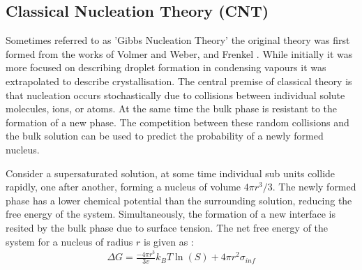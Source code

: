 \subsection{Classical Nucleation Theory (CNT)}
Sometimes referred to as 'Gibbs Nucleation Theory' the 
original theory was first formed from the works of Volmer 
and Weber, and Frenkel \cite{Frenkel1939, Volmer1926}. 
While initially it was more focused on describing droplet
formation in condensing vapours it was extrapolated to 
describe crystallisation. The central premise of classical 
theory is that nucleation occurs stochastically due to 
collisions between individual solute molecules, ions, or 
atoms. At the same time the bulk phase is resistant to the
formation of a new phase. The competition between these 
random collisions and the bulk solution can be used to 
predict the probability of a newly formed nucleus.
 
Consider a supersaturated solution, at some time individual 
sub units collide rapidly, one after another, forming a 
nucleus of volume $4\pi r^3/3$. The newly formed phase has a 
lower chemical potential than the surrounding solution, 
reducing the free energy of the system. Simultaneously, 
the formation of a new interface is resited by the bulk 
phase due to surface tension. The net free energy of the 
system for a nucleus of radius $r$ is given as \cite{Karthika2016}:
\begin{align}
	\Delta G = \frac{-4\pi r^3}{3v}k_BT\ln(S) + 4\pi r^{2}\sigma_{inf}
	\label{eq:CNT} 
\end{align}

